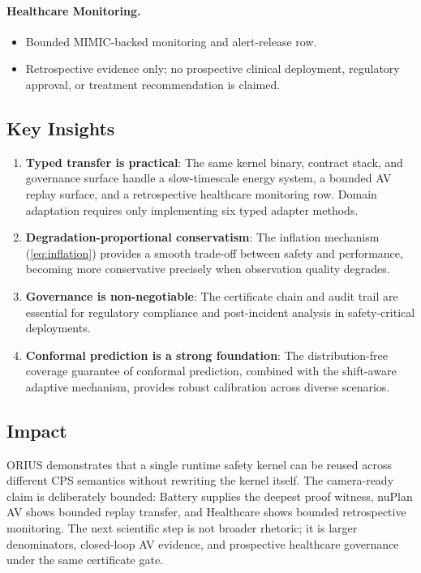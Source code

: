 \paragraph{Healthcare Monitoring.}
\begin{itemize}[nosep]
  \item Bounded MIMIC-backed monitoring and alert-release row.
  \item Retrospective evidence only; no prospective clinical deployment,
        regulatory approval, or treatment recommendation is claimed.
\end{itemize}

\subsection{Key Insights}

\begin{enumerate}[nosep]
  \item \textbf{Typed transfer is practical}: The same kernel binary, contract stack,
        and governance surface handle a slow-timescale energy system, a bounded AV
        replay surface, and a retrospective healthcare monitoring row. Domain
        adaptation requires only implementing six typed adapter methods.
  \item \textbf{Degradation-proportional conservatism}: The inflation mechanism
        (\cref{eq:inflation}) provides a smooth trade-off between safety and
        performance, becoming more conservative precisely when observation quality
        degrades.
  \item \textbf{Governance is non-negotiable}: The certificate chain and audit trail
        are essential for regulatory compliance and post-incident analysis in
        safety-critical deployments.
  \item \textbf{Conformal prediction is a strong foundation}: The distribution-free
        coverage guarantee of conformal prediction, combined with the shift-aware
        adaptive mechanism, provides robust calibration across diverse scenarios.
\end{enumerate}

\subsection{Impact}

ORIUS demonstrates that a single runtime safety kernel can be reused across
different CPS semantics without rewriting the kernel itself. The camera-ready claim
is deliberately bounded: Battery supplies the deepest proof witness, nuPlan AV shows
bounded replay transfer, and Healthcare shows bounded retrospective monitoring.  The
next scientific step is not broader rhetoric; it is larger denominators, closed-loop
AV evidence, and prospective healthcare governance under the same certificate gate.
